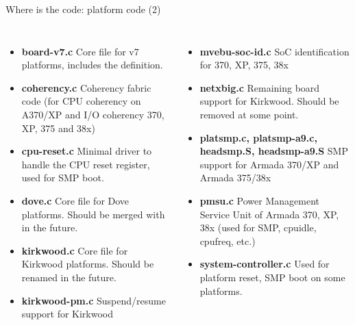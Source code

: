 \begin{frame}{Where is the code: platform code (2)}

\footnotesize
\begin{columns}
\begin{itemize}
\item {\bf board-v7.c} Core file for v7 platforms, includes the
   definition.
\item {\bf coherency.c} Coherency fabric code (for CPU coherency on
  A370/XP and I/O coherency 370, XP, 375 and 38x)
\item {\bf cpu-reset.c} Minimal driver to handle the CPU reset
  register, used for SMP boot.
\item {\bf dove.c} Core file for Dove platforms. Should be merged with
   in the future.
\item {\bf kirkwood.c} Core file for Kirkwood platforms. Should be
  renamed  in the future.
\item {\bf kirkwood-pm.c} Suspend/resume support for Kirkwood
\end{itemize}
\begin{itemize}
\item {\bf mvebu-soc-id.c} SoC identification for 370, XP, 375, 38x
\item {\bf netxbig.c} Remaining board support for Kirkwood. Should be
  removed at some point.
\item {\bf platsmp.c, platsmp-a9.c, headsmp.S, headsmp-a9.S} SMP
  support for Armada 370/XP and Armada 375/38x
\item {\bf pmsu.c} Power Management Service Unit of Armada 370, XP,
  38x (used for SMP, cpuidle, cpufreq, etc.)
\item {\bf system-controller.c} Used for platform reset, SMP boot on
  some platforms.
\end{itemize}
\end{columns}

\end{frame}


